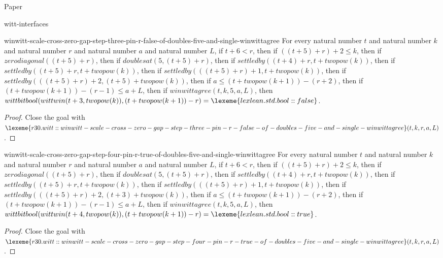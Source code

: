 \begin{lexlean}{Paper}
\begin{section}{witt-interfaces}
  \begin{theorem}{winwitt-scale-cross-zero-gap-step-three-pin-r-false-of-doubles-five-and-single-winwittagree}
  For every natural number \(t\) and natural number \(k\) and natural number \(r\) and natural number \(a\) and natural number \(L\), if \(t + 6 < r\), then if \(((t + 5) + r) + 2 ≤ k\), then if \(zerodiagonal((t + 5) + r)\), then if \(doublesat(5, (t + 5) + r)\), then if \(settledby((t + 4) + r, t + twopow(k))\), then if \(settledby((t + 5) + r, t + twopow(k))\), then if \(settledby(((t + 5) + r) + 1, t + twopow(k))\), then if \(settledby(((t + 5) + r) + 2, (t + 5) + twopow(k))\), then if \(a ≤ (t + twopow(k + 1)) - (r + 2)\), then if \((t + twopow(k + 1)) - (r - 1) ≤ a + L\), then if \(winwittagree(t, k, 5, a, L)\), then \(wittbitbool(wittwin(t + 3, twopow(k)), (t + twopow(k + 1)) - r) = \lexeme{lexlean.std.bool::false}\).
  \begin{proof}
  Close the goal with \(\lexeme{r30.witt::winwitt-scale-cross-zero-gap-step-three-pin-r-false-of-doubles-five-and-single-winwittagree}(t, k, r, a, L)\).
  \end{proof}
  \end{theorem}

  \begin{theorem}{winwitt-scale-cross-zero-gap-step-four-pin-r-true-of-doubles-five-and-single-winwittagree}
  For every natural number \(t\) and natural number \(k\) and natural number \(r\) and natural number \(a\) and natural number \(L\), if \(t + 6 < r\), then if \(((t + 5) + r) + 2 ≤ k\), then if \(zerodiagonal((t + 5) + r)\), then if \(doublesat(5, (t + 5) + r)\), then if \(settledby((t + 4) + r, t + twopow(k))\), then if \(settledby((t + 5) + r, t + twopow(k))\), then if \(settledby(((t + 5) + r) + 1, t + twopow(k))\), then if \(settledby(((t + 5) + r) + 2, (t + 3) + twopow(k))\), then if \(a ≤ (t + twopow(k + 1)) - (r + 2)\), then if \((t + twopow(k + 1)) - (r - 1) ≤ a + L\), then if \(winwittagree(t, k, 5, a, L)\), then \(wittbitbool(wittwin(t + 4, twopow(k)), (t + twopow(k + 1)) - r) = \lexeme{lexlean.std.bool::true}\).
  \begin{proof}
  Close the goal with \(\lexeme{r30.witt::winwitt-scale-cross-zero-gap-step-four-pin-r-true-of-doubles-five-and-single-winwittagree}(t, k, r, a, L)\).
  \end{proof}
  \end{theorem}


\end{section}
\end{lexlean}
